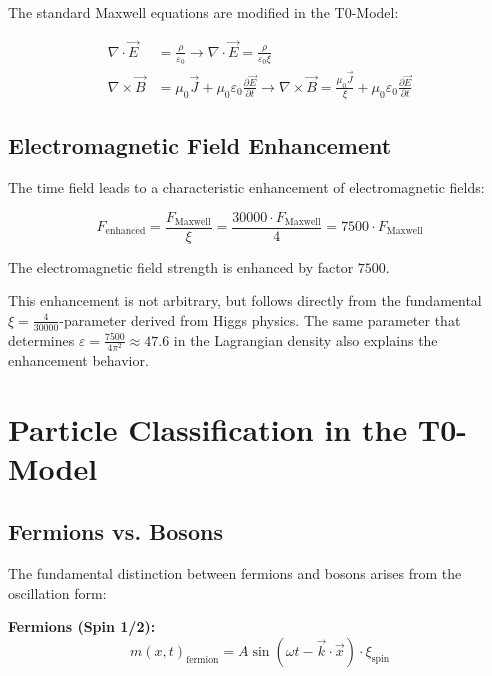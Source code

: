 \documentclass[12pt,a4paper]{report}
\newcommand{\mfield}{m(x,t)}  %
\newcommand{\xipar}{\xi}      %
\begin{document}
	The standard Maxwell equations are modified in the T0-Model:
	
	\begin{align}
		\nabla \cdot \vec{E} &= \frac{\rho}{\varepsilon_0} \rightarrow \nabla \cdot \vec{E} = \frac{\rho}{\varepsilon_0 \xipar} \\
		\nabla \times \vec{B} &= \mu_0 \vec{J} + \mu_0 \varepsilon_0 \frac{\partial \vec{E}}{\partial t} \rightarrow \nabla \times \vec{B} = \frac{\mu_0 \vec{J}}{\xipar} + \mu_0 \varepsilon_0 \frac{\partial \vec{E}}{\partial t}
	\end{align}
	
	\subsection{Electromagnetic Field Enhancement}\label{subsec:em_field_enhancement}
	
	The time field leads to a characteristic enhancement of electromagnetic fields:
	
	\begin{equation}
		F_{\text{enhanced}} = \frac{F_{\text{Maxwell}}}{\xipar} = \frac{30000 \cdot F_{\text{Maxwell}}}{4} = 7500 \cdot F_{\text{Maxwell}}
	\end{equation}
	
	The electromagnetic field strength is enhanced by factor $7500$.
	
	This enhancement is not arbitrary, but follows directly from the fundamental $\xipar = \frac{4}{30000}$-parameter derived from Higgs physics. The same parameter that determines $\varepsilon = \frac{7500}{4\pi^2} \approx 47.6$ in the Lagrangian density also explains the enhancement behavior.
	
	\section{Particle Classification in the T0-Model}\label{sec:particle_classification}
	
	\subsection{Fermions vs. Bosons}\label{subsec:fermions_bosons}
	
	The fundamental distinction between fermions and bosons arises from the oscillation form:
	
	\textbf{Fermions (Spin 1/2):}
	\begin{equation}
		\mfield_{\text{fermion}} = A \sin(\omega t - \vec{k} \cdot \vec{x}) \cdot \xi_{\text{spin}}
	\end{equation}
	
\end{document}
